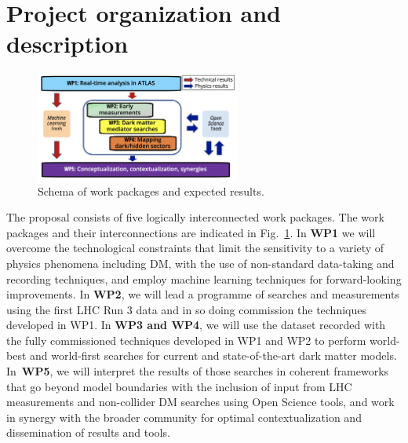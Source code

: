 \documentclass[11pt,a4paper]{article}
\begin{document}

\section{Project organization and description} 
\smallskip


\begin{figure} 
\begin{center}
\includegraphics[width=0.6\textwidth]{figs/WPs_shorter}
\caption{\label{fig:WPs} \footnotesize Schema of work packages and expected results.
}
\end{center}

\vskip10pt
\end{figure}

The proposal consists of five logically interconnected work packages.
The work packages and their interconnections are indicated in Fig.~\ref{fig:WPs}. 
In \textbf{WP1} we will overcome the technological constraints that limit the sensitivity to a variety of physics phenomena including DM, with the use of non-standard data-taking and recording techniques, and employ machine learning techniques for forward-looking improvements. 
In \textbf{WP2}, we will lead a programme of searches and measurements using the first LHC Run 3 data and in so doing commission the techniques developed in WP1. 
In \textbf{WP3 and WP4}, we will use the dataset recorded with the fully commissioned techniques developed in WP1 and WP2 to perform world-best and world-first searches for current and state-of-the-art dark matter models. 
In~\textbf{WP5}, we will interpret the results of those searches in coherent frameworks that go beyond model boundaries with the inclusion of input from LHC measurements and non-collider DM searches using Open Science tools, and work in synergy with the broader community for optimal contextualization and dissemination of results and tools. %
\end{document}
